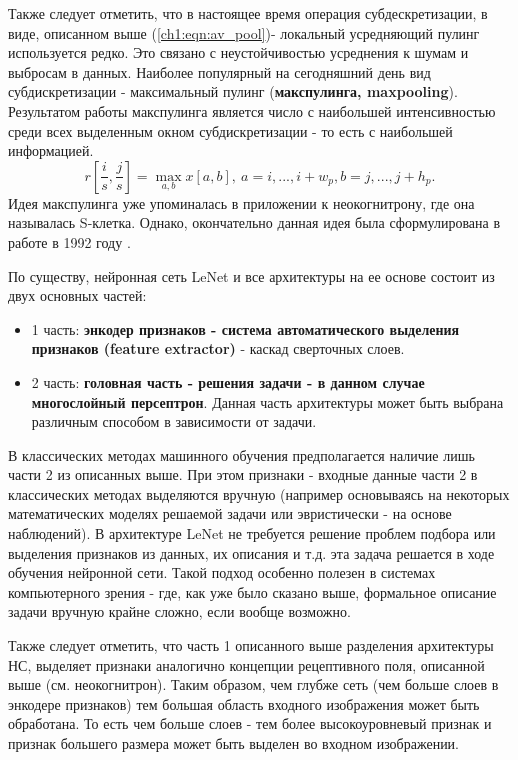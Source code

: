 \documentclass[12pt]{article}
\begin{document}
\begin{sloppypar}
Также следует отметить, что в настоящее время операция субдескретизации, в виде, описанном выше (\ref{ch1:eqn:av_pool})- локальный усредняющий пулинг используется редко. Это связано с неустойчивостью усреднения к шумам и выбросам в данных. Наиболее популярный на сегодняшний день вид субдискретизации - максимальный пулинг (\textbf{макспулинга, maxpooling}). Результатом работы макспулинга является число с наибольшей интенсивностью среди всех выделенным окном субдискретизации - то есть с наибольшей информацией.
\begin{equation}
    \label{ch1:eqn:max_pool}
    r\left[\frac{i}{s},\frac{j}{s}\right] = \max_{a,b}x[a,b], \ a=i,...,i+w_p, b=j,...,j+h_p.
\end{equation}
Идея макспулинга уже упоминалась в приложении к неокогнитрону, где она называлась S-клетка. Однако, окончательно данная идея была сформулирована в работе \cite{weng1992cresceptron} в 1992 году \cite{schmidhuber2015deep}.

По существу, нейронная сеть LeNet и все архитектуры на ее основе состоит из двух основных частей:
\begin{itemize}
    \item 1 часть: \textbf{энкодер признаков - система автоматического выделения признаков (feature extractor)} - каскад сверточных слоев.
    \item 2 часть: \textbf{головная часть - решения задачи  - в данном случае многослойный персептрон}. Данная часть архитектуры может быть выбрана различным способом в зависимости от задачи. 
\end{itemize}

В классических методах машинного обучения предполагается наличие лишь части 2 из описанных выше. При этом признаки - входные данные части 2 в классических методах выделяются вручную (например основываясь на некоторых математических моделях решаемой задачи или эвристически - на основе наблюдений). В архитектуре LeNet не требуется решение проблем подбора или выделения признаков из данных, их описания и т.д. эта задача решается в ходе обучения нейронной сети. Такой подход особенно полезен в системах компьютерного зрения - где, как уже было сказано выше, формальное описание задачи вручную крайне сложно, если вообще возможно. 

Также следует отметить, что часть 1 описанного выше разделения архитектуры НС, выделяет признаки аналогично концепции рецептивного поля, описанной выше (см. неокогнитрон). Таким образом, чем глубже сеть (чем больше слоев в энкодере признаков) тем большая область входного изображения может быть обработана. То есть чем больше слоев - тем более высокоуровневый признак и признак большего размера может быть выделен во входном изображении. 


\end{sloppypar}
\end{document}
